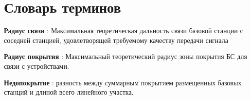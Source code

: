 \chapter*{Словарь терминов}             %


\textbf{Радиус связи} : Максимальная теоретическая дальность связи базовой станции с соседней станцией, удовлетворящей требуемому качеству передачи сигнала

\textbf{Радиус покрытия} : Максимальный теоретический радиус зоны покрытия БС для связи с устройствами.

\textbf{Недопокрытие} : разность между суммарным покрытием размещенных базовых станций и длиной всего линейного участка.
